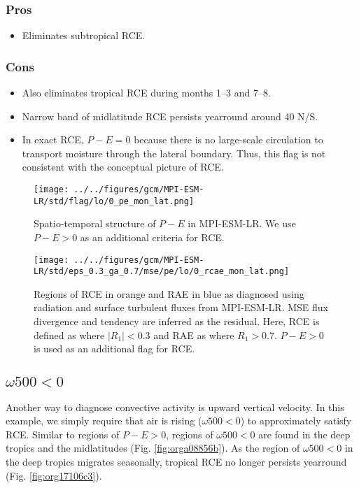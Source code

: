 \documentclass[11pt]{article}
\begin{document}
\subsubsection*{Pros}
\label{sec:orgf1e72ac}
\begin{itemize}
\item Eliminates subtropical RCE.
\end{itemize}
\subsubsection*{Cons}
\label{sec:orgc858e38}
\begin{itemize}
\item Also eliminates tropical RCE during months 1--3 and 7--8.
\item Narrow band of midlatitude RCE persists yearround around 40 N/S.
\item In exact RCE, \(P-E=0\) because there is no large-scale circulation to transport moisture through the lateral boundary. Thus, this flag is not consistent with the conceptual picture of RCE.
\end{itemize}

\clearpage

\begin{figure}[!h]
\centering
\texttt{[image: ../../figures/gcm/MPI-ESM-LR/std/flag/lo/0\_pe\_mon\_lat.png]}
\caption{\label{fig:org43fc374}Spatio-temporal structure of \(P-E\) in MPI-ESM-LR. We use \(P-E>0\) as an additional criteria for RCE.}
\end{figure}

\begin{figure}[!h]
\centering
\texttt{[image: ../../figures/gcm/MPI-ESM-LR/std/eps\_0.3\_ga\_0.7/mse/pe/lo/0\_rcae\_mon\_lat.png]}
\caption{\label{fig:org1fa1e68}Regions of RCE in orange and RAE in blue as diagnosed using radiation and surface turbulent fluxes from MPI-ESM-LR. MSE flux divergence and tendency are inferred as the residual. Here, RCE is defined as where \(|R_1| < 0.3\) and RAE as where \(R_1 > 0.7\). \(P-E>0\) is used as an additional flag for RCE.}
\end{figure}

\clearpage
\subsection{\(\omega500<0\)}
\label{sec:org5643330}
Another way to diagnose convective activity is upward vertical velocity. In this example, we simply require that air is rising (\(\omega500<0\)) to approximately satisfy RCE. Similar to regions of \(P-E>0\), regions of \(\omega500<0\) are found in the deep tropics and the midlatitudes (Fig. \ref{fig:orga08856b}). As the region of \(\omega500<0\) in the deep tropics migrates seasonally, tropical RCE no longer persists yearround (Fig. \ref{fig:org17106c3}).
\end{document}
